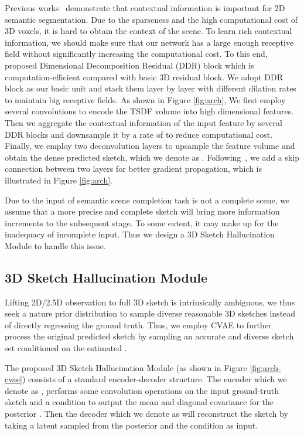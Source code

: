\documentclass[10pt,twocolumn,letterpaper]{article}
\begin{document}
Previous works~\cite{peng2017large,zhang2018context, yu2018learning} demonstrate that contextual information is important for 2D semantic segmentation. Due to the sparseness and the high computational cost of 3D voxels, it is hard to obtain the context of the scene. To learn rich contextual information, we should make sure that our network has a large enough receptive field without significantly increasing the computational cost. To this end,~\cite{li2019rgbd-ddrnet} proposed Dimensional Decomposition Residual (DDR) block which is computation-efficient compared with basic 3D residual block. We adopt DDR block as our basic unit and stack them layer by layer with different dilation rates to maintain big receptive fields. As shown in Figure \ref{fig:arch}, We first employ several convolutions to encode the TSDF volume into high dimensional features.  Then we aggregate the contextual information of the input feature by several DDR blocks and downsample it by a rate of  to reduce computational cost. Finally, we employ two deconvolution layers to upsample the feature volume and obtain the dense predicted sketch, which we denote as . Following~\cite{song2017semantic-sscnet}, we add a skip connection between two layers for better gradient propagation, which is illustrated in Figure \ref{fig:arch}.

Due to the input of semantic scene completion task is not a complete scene, we assume that a more precise and complete sketch will bring more information increments to the subsequent stage. To some extent, it may make up for the inadequacy of incomplete input. Thus we design a 3D Sketch Hallucination Module to handle this issue.

\subsection{3D Sketch Hallucination Module}
Lifting 2D/2.5D observation to full 3D sketch is intrinsically ambiguous, we thus seek a nature prior distribution to sample diverse reasonable 3D sketches instead of directly regressing the ground truth. Thus, we employ CVAE to further process the original predicted sketch by sampling an accurate and diverse sketch set  conditioned on the estimated .

The proposed 3D Sketch Hallucination Module (as shown in Figure \ref{fig:arch-cvae}) consists of a standard encoder-decoder structure. The encoder which we denote as , performs some convolution operations on the input ground-truth sketch and a condition  to output the mean and diagonal covariance for the posterior . Then the decoder which we denote as  will reconstruct the sketch by taking a latent  sampled from the posterior  and the condition  as input.
\end{document}
